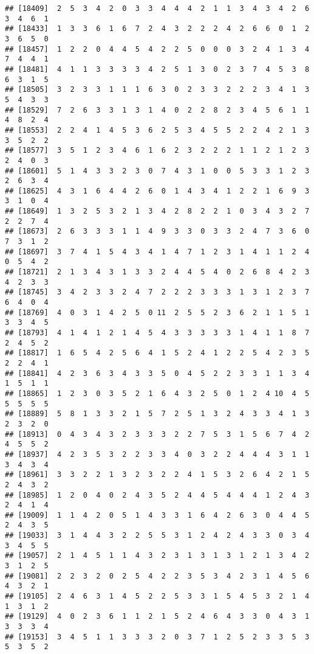 \documentclass[
]{article}
\begin{document}
\begin{verbatim}
## [18409]  2  5  3  4  2  0  3  3  4  4  4  2  1  1  3  4  3  4  2  6  3  4  6  1
## [18433]  1  3  3  6  1  6  7  2  4  3  2  2  2  4  2  6  6  0  1  2  3  6  5  0
## [18457]  1  2  2  0  4  4  5  4  2  2  5  0  0  0  3  2  4  1  3  4  7  4  4  1
## [18481]  4  1  1  3  3  3  3  4  2  5  1  3  0  2  3  7  4  5  3  8  6  3  1  5
## [18505]  3  2  3  3  1  1  1  6  3  0  2  3  3  2  2  2  3  4  1  3  5  4  3  3
## [18529]  7  2  6  3  3  1  3  1  4  0  2  2  8  2  3  4  5  6  1  1  4  8  2  4
## [18553]  2  2  4  1  4  5  3  6  2  5  3  4  5  5  2  2  4  2  1  3  3  5  2  2
## [18577]  3  5  1  2  3  4  6  1  6  2  3  2  2  2  1  1  2  1  2  3  2  4  0  3
## [18601]  5  1  4  3  3  2  3  0  7  4  3  1  0  0  5  3  3  1  2  3  2  6  3  4
## [18625]  4  3  1  6  4  4  2  6  0  1  4  3  4  1  2  2  1  6  9  3  3  1  0  4
## [18649]  1  3  2  5  3  2  1  3  4  2  8  2  2  1  0  3  4  3  2  7  2  2  7  4
## [18673]  2  6  3  3  3  1  1  4  9  3  3  0  3  3  2  4  7  3  6  0  7  3  1  2
## [18697]  3  7  4  1  5  4  3  4  1  4  7  1  2  3  1  4  1  1  2  4  0  5  4  2
## [18721]  2  1  3  4  3  1  3  3  2  4  4  5  4  0  2  6  8  4  2  3  4  2  3  3
## [18745]  3  4  2  3  3  2  4  7  2  2  2  3  3  3  1  3  1  2  3  7  6  4  0  4
## [18769]  4  0  3  1  4  2  5  0 11  2  5  5  2  3  6  2  1  1  5  1  3  3  4  5
## [18793]  4  1  4  1  2  1  4  5  4  3  3  3  3  3  1  4  1  1  8  7  2  4  5  2
## [18817]  1  6  5  4  2  5  6  4  1  5  2  4  1  2  2  5  4  2  3  5  2  2  4  1
## [18841]  4  2  3  6  3  4  3  3  5  0  4  5  2  2  3  3  1  1  3  4  1  5  1  1
## [18865]  1  2  3  0  3  5  2  1  6  4  3  2  5  0  1  2  4 10  4  5  5  5  5  5
## [18889]  5  8  1  3  3  2  1  5  7  2  5  1  3  2  4  3  3  4  1  3  2  3  2  0
## [18913]  0  4  3  4  3  2  3  3  3  2  2  7  5  3  1  5  6  7  4  2  4  5  5  2
## [18937]  4  2  3  5  3  2  2  3  3  4  0  3  2  2  4  4  4  3  1  1  3  4  3  4
## [18961]  3  3  2  2  1  3  2  3  2  2  4  1  5  3  2  6  4  2  1  5  2  4  3  2
## [18985]  1  2  0  4  0  2  4  3  5  2  4  4  5  4  4  4  1  2  4  3  2  4  1  4
## [19009]  1  1  4  2  0  5  1  4  3  3  1  6  4  2  6  3  0  4  4  5  2  4  3  5
## [19033]  3  1  4  4  3  2  2  5  5  3  1  2  4  2  4  3  3  0  3  4  3  4  5  5
## [19057]  2  1  4  5  1  1  4  3  2  3  1  3  1  3  1  2  1  3  4  2  3  1  2  5
## [19081]  2  2  3  2  0  2  5  4  2  2  3  5  3  4  2  3  1  4  5  6  4  3  2  1
## [19105]  2  4  6  3  1  4  5  2  2  5  3  3  1  5  4  5  3  2  1  4  1  3  1  2
## [19129]  4  0  2  3  6  1  1  2  1  5  2  4  6  4  3  3  0  4  3  1  3  3  3  4
## [19153]  3  4  5  1  1  3  3  3  2  0  3  7  1  2  5  2  3  3  5  3  5  3  5  2

\end{verbatim}
\end{document}
